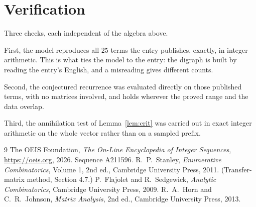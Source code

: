 \documentclass[11pt,a4paper]{article}
\theoremstyle{plain}
\theoremstyle{definition}
\begin{document}
\section{Verification}

Three checks, each independent of the algebra above.

First, the model reproduces all $25$ terms the entry publishes, exactly, in integer
arithmetic. This is what ties the model to the entry: the digraph is built by reading the
entry's English, and a misreading gives different counts.

Second, the conjectured recurrence was evaluated directly on those published terms, with no
matrices involved, and holds wherever the proved range and the data overlap.

Third, the annihilation test of Lemma~\ref{lem:crit} was carried out in exact integer
arithmetic on the whole vector rather than on a sampled prefix.

\begin{thebibliography}{9}
 The OEIS Foundation, \emph{The On-Line Encyclopedia of Integer
Sequences}, \url{https://oeis.org}, 2026. Sequence A211596.
 R.~P.~Stanley, \emph{Enumerative Combinatorics}, Volume 1, 2nd ed.,
Cambridge University Press, 2011. (Transfer-matrix method, Section 4.7.)
 P.~Flajolet and R.~Sedgewick, \emph{Analytic Combinatorics}, Cambridge
University Press, 2009.
 R.~A.~Horn and C.~R.~Johnson, \emph{Matrix Analysis}, 2nd ed., Cambridge
University Press, 2013.
\end{thebibliography}
\end{document}
